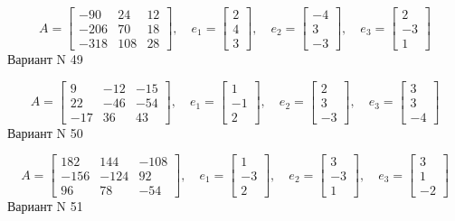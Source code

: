 \documentclass[11pt]{report}
\begin{document}
$$A = \left[\begin{matrix}-90 & 24 & 12\\-206 & 70 & 18\\-318 & 108 & 28\end{matrix}\right],\quad e_1 = \left[\begin{matrix}2\\4\\3\end{matrix}\right],\quad e_2 = \left[\begin{matrix}-4\\3\\-3\end{matrix}\right],\quad e_3 = \left[\begin{matrix}2\\-3\\1\end{matrix}\right]$$Вариант N 49

$$A = \left[\begin{matrix}9 & -12 & -15\\22 & -46 & -54\\-17 & 36 & 43\end{matrix}\right],\quad e_1 = \left[\begin{matrix}1\\-1\\2\end{matrix}\right],\quad e_2 = \left[\begin{matrix}2\\3\\-3\end{matrix}\right],\quad e_3 = \left[\begin{matrix}3\\3\\-4\end{matrix}\right]$$Вариант N 50

$$A = \left[\begin{matrix}182 & 144 & -108\\-156 & -124 & 92\\96 & 78 & -54\end{matrix}\right],\quad e_1 = \left[\begin{matrix}1\\-3\\2\end{matrix}\right],\quad e_2 = \left[\begin{matrix}3\\-3\\1\end{matrix}\right],\quad e_3 = \left[\begin{matrix}3\\1\\-2\end{matrix}\right]$$Вариант N 51
\end{document}
